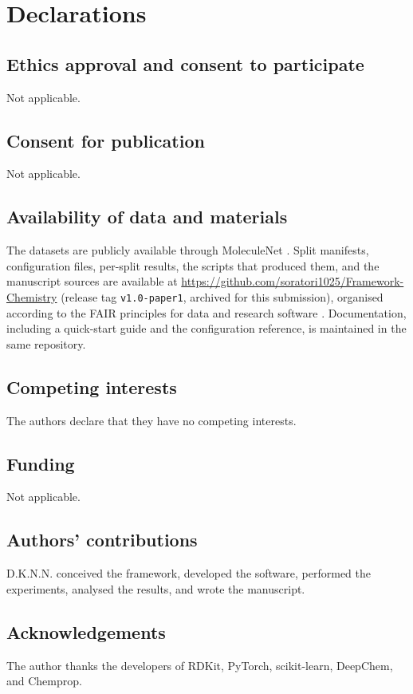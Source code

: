 \section*{Declarations}

\subsection*{Ethics approval and consent to participate}
Not applicable.

\subsection*{Consent for publication}
Not applicable.

\subsection*{Availability of data and materials}
The datasets are publicly available through MoleculeNet \cite{wu2018moleculenet}. Split manifests, configuration files, per-split results, the scripts that produced them, and the manuscript sources are available at \url{https://github.com/soratori1025/Framework-Chemistry} (release tag \texttt{v1.0-paper1}, archived for this submission), organised according to the FAIR principles for data \cite{wilkinson2016fair} and research software \cite{barker2022fair4rs}. Documentation, including a quick-start guide and the configuration reference, is maintained in the same repository.

\subsection*{Competing interests}
The authors declare that they have no competing interests.

\subsection*{Funding}
Not applicable.

\subsection*{Authors' contributions}
D.K.N.N. conceived the framework, developed the software, performed the experiments, analysed the results, and wrote the manuscript.

\subsection*{Acknowledgements}
The author thanks the developers of RDKit, PyTorch, scikit-learn, DeepChem, and Chemprop.
